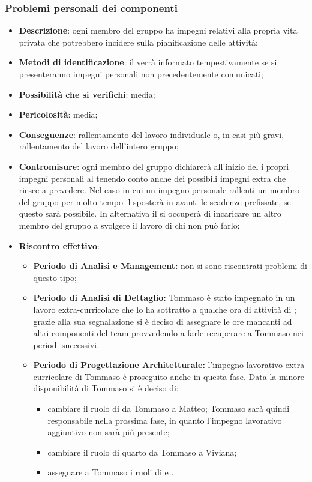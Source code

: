 		\subsubsection{Problemi personali dei componenti}
		\begin{itemize}
			\item \textbf{Descrizione}: ogni membro del gruppo ha impegni relativi alla propria vita privata che potrebbero incidere sulla pianificazione delle attività;
			\item \textbf{Metodi di identificazione}: il \RES{} verrà informato tempestivamente se si presenteranno impegni personali non precedentemente comunicati;
			\item \textbf{Possibilità che si verifichi}: media;
			\item \textbf{Pericolosità}: media;
			\item \textbf{Conseguenze}: rallentamento del lavoro individuale o, in casi più gravi, rallentamento del lavoro dell'intero gruppo;
			\item \textbf{Contromisure}: ogni membro del gruppo dichiarerà all'inizio del  i propri impegni personali al \RES{} tenendo conto anche dei possibili impegni extra che riesce a prevedere. Nel caso in cui un impegno personale rallenti un membro del gruppo per molto tempo il \RES{} sposterà in avanti le scadenze prefissate, se questo sarà possibile. In alternativa il \RES{} si occuperà di incaricare un altro membro del gruppo a svolgere il lavoro di chi non può farlo; 
			\item \textbf{Riscontro effettivo}:
			\begin{itemize}
				\item \textbf{Periodo di Analisi e Management:} non si sono riscontrati problemi di questo tipo;
				\item \textbf{Periodo di Analisi di Dettaglio:} Tommaso è stato impegnato in un lavoro extra-curricolare che lo ha sottratto a qualche ora di attività di \AN; grazie alla sua segnalazione si è deciso di assegnare le ore mancanti ad altri componenti del team provvedendo a farle recuperare a Tommaso nei periodi successivi.
				\item \textbf{Periodo di Progettazione Architetturale:} l'impegno lavorativo extra-curricolare di Tommaso è proseguito anche in questa fase. Data la minore disponibilità di Tommaso si è deciso di:
					\begin{itemize}
						\item cambiare il ruolo di \RES {}da Tommaso a Matteo; Tommaso sarà quindi responsabile nella prossima fase, in quanto l'impegno lavorativo aggiuntivo non sarà più presente;
						\item cambiare il ruolo di quarto \PRJ {} da Tommaso a Viviana;
						\item assegnare a Tommaso i ruoli di \VER{} e \AN.
					\end{itemize}
			\end{itemize}
		\end{itemize}
		
